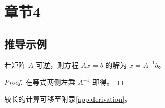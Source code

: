 \chapter{章节4}
\label{chap:chapter4}

\section{推导示例}
\begin{theorem}
若矩阵 \(A\) 可逆，则方程 \(Ax=b\) 的解为 \(x=A^{-1}b\)。
\end{theorem}
\begin{proof}
在等式两侧左乘 \(A^{-1}\) 即得。
\end{proof}

较长的计算可移至附录\ref{app:derivation}。
